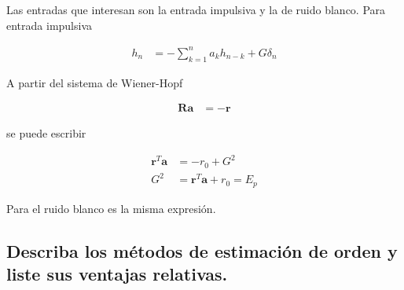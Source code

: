 \documentclass[a4paper,10pt,spanish,oneside]{article}
\begin{document}
Las entradas que interesan son la entrada impulsiva y la de ruido blanco. Para entrada impulsiva

\begin{align*}
h_{n} &= -\sum_{k=1}^{n}a_{k}h_{n-k}+G\delta_{n}
\end{align*}

A partir del sistema de Wiener-Hopf

\begin{align*}
\mathbf{R}\mathbf{a} &= -\mathbf{r}
\end{align*}

se puede escribir

\begin{align*}
\mathbf{r}^{T}\mathbf{a} &= -r_{0}+G^{2} \\
G^{2} &= \mathbf{r}^{T}\mathbf{a}+r_{0}=E_{p}
\end{align*}

Para el ruido blanco es la misma expresión.

\subsection{Describa los métodos de estimación de orden y liste sus ventajas relativas.}
\end{document}
